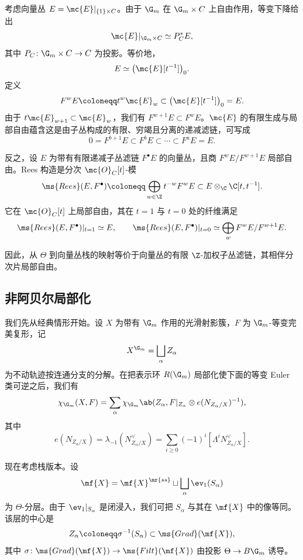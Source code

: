 \begin{rmk}
    考虑向量丛 \(E=\mc{E}|_{\{1\}\times C}\)。由于 \(\G_m\) 在 \(\G_m\times C\) 上自由作用，等变下降给出
    \[
        \mc{E}|_{\G_m\times C}\simeq P_C^*E,
    \]
    其中 \(P_C\colon\G_m\times C\to C\) 为投影。等价地，
    \[
        E\simeq\big(\mc{E}[t^{-1}]\big)_0.
    \]
    定义
    \[
        F^wE\coloneqq t^w\mc{E}_w\subset\big(\mc{E}[t^{-1}]\big)_0=E.
    \]
    由于 \(t\mc{E}_{w+1}\subset\mc{E}_w\)，我们有 \(F^{w+1}E\subset F^wE\)。\(\mc{E}\) 的有限生成与局部自由蕴含这是由子丛构成的有限、穷竭且分离的递减滤链，可写成
    \[
        0=F^{b+1}E\subset F^bE\subset\cdots\subset F^aE=E.
    \]

    反之，设 \(E\) 为带有有限递减子丛滤链 \(F^\bullet E\) 的向量丛，且商 \(F^wE/F^{w+1}E\) 局部自由。Rees 构造是分次 \(\mc{O}_C[t]\)-模
    \[
        \ms{Rees}(E,F^\bullet)
        \coloneqq
        \bigoplus_{w\in\Z}t^{-w}F^wE
        \subset
        E\otimes_{\C}\C[t,t^{-1}].
    \]
    它在 \(\mc{O}_C[t]\) 上局部自由，其在 \(t=1\) 与 \(t=0\) 处的纤维满足
    \[
        \ms{Rees}(E,F^\bullet)|_{t=1}\simeq E,
        \qquad
        \ms{Rees}(E,F^\bullet)|_{t=0}
        \simeq
        \bigoplus_w F^wE/F^{w+1}E.
    \]
\end{rmk}

因此，从 \(\Theta\) 到向量丛栈的映射等价于向量丛的有限 \(\Z\)-加权子丛滤链，其相伴分次片局部自由。


\subsection{非阿贝尔局部化}%
\label{sub:Non-abelian localization}

我们先从经典情形开始。设 \(X\) 为带有 \(\G_m\) 作用的光滑射影簇，\(F\) 为 \(\G_m\)-等变完美复形，记
\[
    X^{\G_m}=\bigsqcup_\alpha Z_\alpha
\]
为不动轨迹按连通分支的分解。在把表示环 \(R(\G_m)\) 局部化使下面的等变 Euler 类可逆之后，我们有
\[
    \chi_{\G_m}(X,F)
    =
    \sum_\alpha
    \chi_{\G_m}\ab(
        Z_\alpha,
        F|_{Z_\alpha}\otimes e(N_{Z_\alpha/X})^{-1}
    ),
\]
其中
\[
    e(N_{Z_\alpha/X})
    =
    \lambda_{-1}(N_{Z_\alpha/X}^\vee)
    =
    \sum_{i\geq0}(-1)^i[\Lambda^iN_{Z_\alpha/X}^\vee].
\]

现在考虑栈版本。设
\[
    \mf{X}
    =
    \mf{X}^{\mr{ss}}
    \sqcup
    \bigsqcup_\alpha\ev_1(S_\alpha)
\]
为 \(\Theta\)-分层。由于 \(\ev_1|_{S_\alpha}\) 是闭浸入，我们可把 \(S_\alpha\) 与其在 \(\mf{X}\) 中的像等同。该层的中心是
\[
    Z_\alpha\coloneqq\sigma^{-1}(S_\alpha)\subset\ms{Grad}(\mf{X}),
\]
其中 \(\sigma\colon\ms{Grad}(\mf{X})\to\ms{Filt}(\mf{X})\) 由投影 \(\Theta\to B\G_m\) 诱导。

